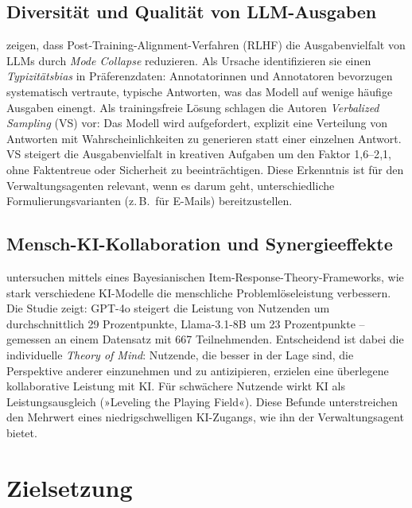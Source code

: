 \documentclass[12pt, a4paper]{article}
\begin{document}
\subsection{Diversität und Qualität von LLM-Ausgaben}

\textcite{zhang2025verbalized} zeigen, dass Post-Training-Alignment-Verfahren (RLHF) die Ausgabenvielfalt von LLMs durch \textit{Mode Collapse} reduzieren. Als Ursache identifizieren sie einen \textit{Typizitätsbias} in Präferenzdaten: Annotatorinnen und Annotatoren bevorzugen systematisch vertraute, typische Antworten, was das Modell auf wenige häufige Ausgaben einengt. Als trainingsfreie Lösung schlagen die Autoren \textit{Verbalized Sampling} (VS) vor: Das Modell wird aufgefordert, explizit eine Verteilung von Antworten mit Wahrscheinlichkeiten zu generieren statt einer einzelnen Antwort. VS steigert die Ausgabenvielfalt in kreativen Aufgaben um den Faktor 1{,}6--2{,}1, ohne Faktentreue oder Sicherheit zu beeinträchtigen. Diese Erkenntnis ist für den Verwaltungsagenten relevant, wenn es darum geht, unterschiedliche Formulierungsvarianten (z.\,B.\ für E-Mails) bereitzustellen.

\subsection{Mensch-KI-Kollaboration und Synergieeffekte}

\textcite{anonymous2025synergy} untersuchen mittels eines Bayesianischen Item-Response-Theory-Frameworks, wie stark verschiedene KI-Modelle die menschliche Problemlöseleistung verbessern. Die Studie zeigt: GPT-4o steigert die Leistung von Nutzenden um durchschnittlich 29 Prozentpunkte, Llama-3.1-8B um 23 Prozentpunkte -- gemessen an einem Datensatz mit 667 Teilnehmenden. Entscheidend ist dabei die individuelle \textit{Theory of Mind}: Nutzende, die besser in der Lage sind, die Perspektive anderer einzunehmen und zu antizipieren, erzielen eine überlegene kollaborative Leistung mit KI. Für schwächere Nutzende wirkt KI als Leistungsausgleich (»Leveling the Playing Field«). Diese Befunde unterstreichen den Mehrwert eines niedrigschwelligen KI-Zugangs, wie ihn der Verwaltungsagent bietet.

\section{Zielsetzung}
\end{document}
